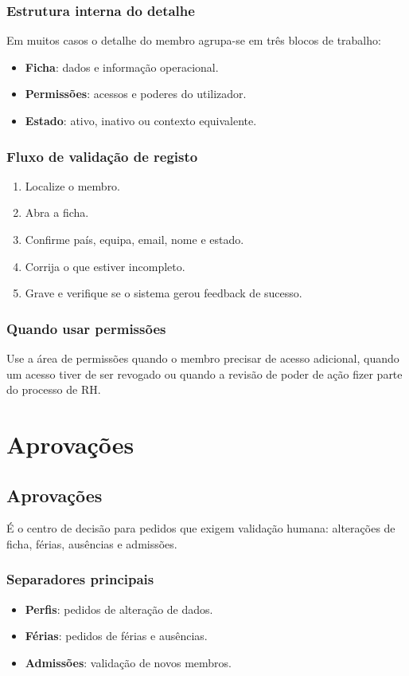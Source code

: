 \subsection{Estrutura interna do detalhe}
Em muitos casos o detalhe do membro agrupa-se em três blocos de trabalho:
\begin{itemize}
  \item \textbf{Ficha}: dados e informação operacional.
  \item \textbf{Permissões}: acessos e poderes do utilizador.
  \item \textbf{Estado}: ativo, inativo ou contexto equivalente.
\end{itemize}

\subsection{Fluxo de validação de registo}
\begin{enumerate}
  \item Localize o membro.
  \item Abra a ficha.
  \item Confirme país, equipa, email, nome e estado.
  \item Corrija o que estiver incompleto.
  \item Grave e verifique se o sistema gerou feedback de sucesso.
\end{enumerate}

\subsection{Quando usar permissões}
Use a área de permissões quando o membro precisar de acesso adicional, quando um acesso tiver de ser revogado ou quando a revisão de poder de ação fizer parte do processo de RH.

\chapter{Aprovações}
\section{Aprovações}
É o centro de decisão para pedidos que exigem validação humana: alterações de ficha, férias, ausências e admissões.

\subsection{Separadores principais}
\begin{itemize}
  \item \textbf{Perfis}: pedidos de alteração de dados.
  \item \textbf{Férias}: pedidos de férias e ausências.
  \item \textbf{Admissões}: validação de novos membros.
\end{itemize}

